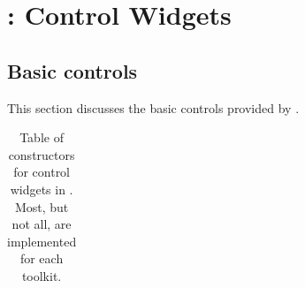 \chapter{: Control Widgets}
\section{Basic controls}
\label{sec:gWidgets-controls}

  

  
This section discusses the basic controls provided by
.

\begin{table}
\centering
\label{tab:gWidgets-control-widgets}
\caption{Table of constructors for control widgets in . Most, but not all, are implemented for each toolkit.}
\begin{tabular}{@{}lp{}@{}}
\toprule


\end{tabular}
\end{table}
